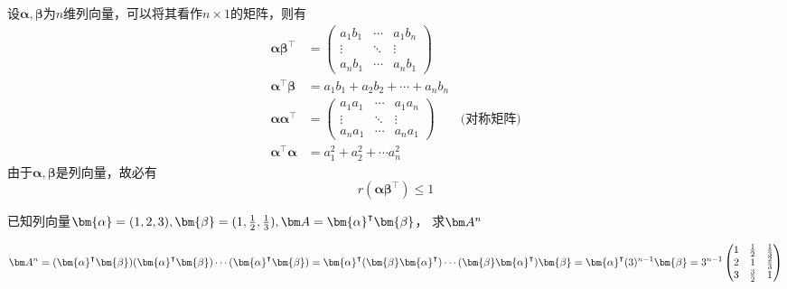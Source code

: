 设$\bm{\alpha},\bm{\beta}$为$n$维列向量，可以将其看作$n\times 1$的矩阵，则有
\begin{align}
    \bm{\alpha}\bm{\beta}^\intercal  & =
    \begin{pmatrix}
        a_1b_1 & \cdots & a_1b_n \\
        \vdots & \ddots & \vdots \\
        a_nb_1 & \cdots & a_nb_1
    \end{pmatrix}                                           \\
    \bm{\alpha}^\intercal\bm{\beta}  & = a_1b_1+a_2b_2 + \cdots + a_nb_n \\
    \bm{\alpha}\bm{\alpha}^\intercal & =
    \begin{pmatrix}
        a_1a_1 & \cdots & a_1a_n \\
        \vdots & \ddots & \vdots \\
        a_na_1 & \cdots & a_na_1
    \end{pmatrix}\qquad\text{(对称矩阵)}                    \\
    \bm{\alpha}^\intercal\bm{\alpha} & = a_1^2 + a_2^2 + \cdots a_n^2
\end{align}
由于$\bm{\alpha},\bm{\beta}$是列向量，故必有
\begin{equation}
    r(\bm{\alpha}\bm{\beta}^\intercal) \leq 1
\end{equation}

\begin{example}
    已知列向量$\bm{\alpha} = (1,2,3),\bm{\beta}=(1,\frac{1}{2},\frac{1}{3}),\mat{A}=\bm{\alpha}^\intercal\bm{\beta}$，
    求$\mat{A}^n$
\end{example}
\begin{solution}
    \[
        \mat{A}^n = (\bm{\alpha}^\intercal\bm{\beta})(\bm{\alpha}^\intercal\bm{\beta})\cdots(\bm{\alpha}^\intercal\bm{\beta})
        =\bm{\alpha}^\intercal(\bm{\beta}\bm{\alpha}^\intercal)\cdots(\bm{\beta}\bm{\alpha}^\intercal)\bm{\beta}
        =\bm{\alpha}^\intercal(3)^{n-1}\bm{\beta}
        =3^{n-1}
        \begin{pmatrix}
            1 & \frac{1}{2} & \frac{1}{3} \\
            2 & 1           & \frac{2}{3} \\
            3 & \frac{3}{2} & 1
        \end{pmatrix}
    \]
\end{solution}

